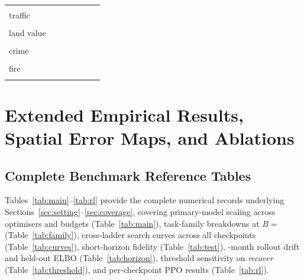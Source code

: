\begin{table}[tbp]
\begin{tabular}{@{}lllllll@{}}
 & \PcPollutionSizeAllCI{} & \PcPollutionChgAllCI{} & \PcPollutionSizeRecovCI{} & \PcPollutionChgRecovCI{} & \PcPollutionSizeOtherCI{} & \PcPollutionChgOtherCI{} \\[1pt]
traffic & \PcTrafficSizeAll{} & \PcTrafficChgAll{} & \PcTrafficSizeRecov{} & \PcTrafficChgRecov{} & \PcTrafficSizeOther{} & \PcTrafficChgOther{} \\
 & \PcTrafficSizeAllCI{} & \PcTrafficChgAllCI{} & \PcTrafficSizeRecovCI{} & \PcTrafficChgRecovCI{} & \PcTrafficSizeOtherCI{} & \PcTrafficChgOtherCI{} \\[1pt]
land value & \PcLandValueSizeAll{} & \PcLandValueChgAll{} & \PcLandValueSizeRecov{} & \PcLandValueChgRecov{} & \PcLandValueSizeOther{} & \PcLandValueChgOther{} \\
 & \PcLandValueSizeAllCI{} & \PcLandValueChgAllCI{} & \PcLandValueSizeRecovCI{} & \PcLandValueChgRecovCI{} & \PcLandValueSizeOtherCI{} & \PcLandValueChgOtherCI{} \\[1pt]
crime & \PcCrimeSizeAll{} & \PcCrimeChgAll{} & \PcCrimeSizeRecov{} & \PcCrimeChgRecov{} & \PcCrimeSizeOther{} & \PcCrimeChgOther{} \\
 & \PcCrimeSizeAllCI{} & \PcCrimeChgAllCI{} & \PcCrimeSizeRecovCI{} & \PcCrimeChgRecovCI{} & \PcCrimeSizeOtherCI{} & \PcCrimeChgOtherCI{} \\[1pt]
fire & \PcFireSizeAll{} & \PcFireChgAll{} & \PcFireSizeRecov{} & \PcFireChgRecov{} & \PcFireSizeOther{} & \PcFireChgOther{} \\
 & \PcFireSizeAllCI{} & \PcFireChgAllCI{} & \PcFireSizeRecovCI{} & \PcFireChgRecovCI{} & \PcFireSizeOtherCI{} & \PcFireChgOtherCI{} \\[1pt]
\bottomrule
\end{tabular}
\end{table}



\section{Extended Empirical Results, Spatial Error Maps, and Ablations}\label{app:results}



\subsection{Complete Benchmark Reference Tables}

Tables~\ref{tab:main}--\ref{tab:rl} provide the complete numerical records underlying Sections~\ref{sec:setting}--\ref{sec:coverage}, covering primary-model scaling across optimisers and budgets (Table~\ref{tab:main}), task-family breakdowns at $B ={}$ (Table~\ref{tab:family}), cross-ladder search curves across all \Ladder{} checkpoints (Table~\ref{tab:curves}), short-horizon fidelity (Table~\ref{tab:test}), \Horizon-month rollout drift and held-out ELBO (Table~\ref{tab:horizon}), threshold sensitivity on \emph{recover} (Table~\ref{tab:threshold}), and per-checkpoint PPO results (Table~\ref{tab:rl}).

